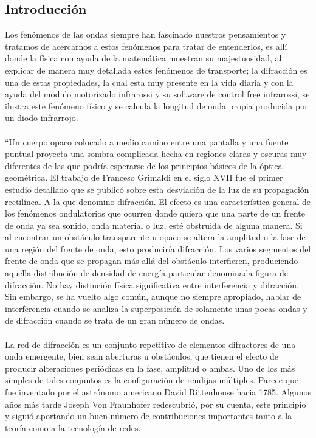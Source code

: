\documentclass[12]{article}
\begin{document}
\begin{multicols}{2}
\section{Introducción}
Los fenómenos de las ondas siempre han fascinado nuestros pensamientos y tratamos de acercarnos a estos fenómenos para tratar de entenderlos, es allí donde la física con ayuda de la matemática muestran su majestuosidad, al explicar de manera muy detallada estos fenómenos de transporte; la difracción es una de estas propiedades, la cual esta muy presente en la vida diaria y con la ayuda del modulo motorizado infrarossi y su software de control free infrarossi, se ilustra este fenómeno físico y se calcula la longitud de onda propia producida por un diodo infrarrojo. \\ \\``Un cuerpo opaco colocado a medio camino entre una pantalla y una fuente puntual proyecta una sombra complicada hecha en regiones claras y oscuras muy diferentes de las que podría esperarse de los principios básicos de la óptica geométrica. El trabajo de Franceso Grimaldi en el siglo XVII fue el primer estudio detallado que se publicó sobre esta desviación de la luz de su propagación rectilínea. A la que denomino difracción. El efecto es una característica general de los fenómenos ondulatorios que ocurren donde quiera que una parte de un frente de onda ya sea sonido, onda material o luz, esté obstruida de alguna manera. Si al encontrar un obstáculo transparente u opaco se altera la amplitud o la fase de una región del frente de onda, esto produciría difracción. Los varios segmentos del frente de onda que se propagan más allá del obstáculo interfieren, produciendo aquella distribución de densidad de energía particular denominada figura de difracción. No hay distinción física significativa entre interferencia y difracción. Sin embargo, se ha vuelto algo común, aunque no siempre apropiado, hablar de interferencia cuando se analiza la superposición de solamente unas pocas ondas y de difracción cuando se trata de un gran número de ondas. \\ \\
La red de difracción es un conjunto repetitivo de elementos difractores de una onda emergente, bien sean aberturas u obstáculos, que tienen el efecto de producir alteraciones periódicas en la fase, amplitud o ambas. Uno de los más simples de tales conjuntos es la configuración de rendijas múltiples. Parece que fue inventado por el astrónomo americano David Rittenhouse hacia 1785. Algunos años más tarde Joseph Von Fraunhofer redescubrió, por su cuenta, este principio y siguió aportando un buen número de contribuciones importantes tanto a la teoría como a la tecnología de redes.\\ \\ 

\end{multicols}
\end{document}
